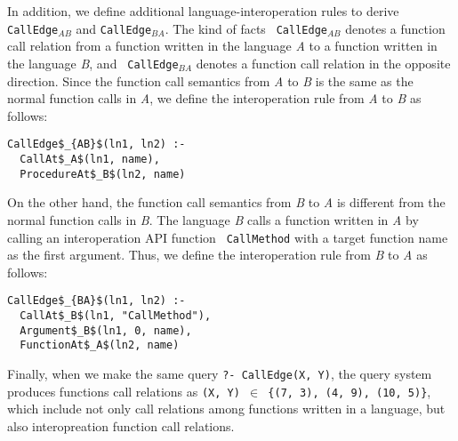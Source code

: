 \noindent
In addition, we define additional language-interoperation rules to derive {\tt
CallEdge$_{AB}$} and {\tt CallEdge$_{BA}$}. The kind of facts {\tt
CallEdge$_{AB}$} denotes a function call relation from a function written in
the language {\it A} to a function written in the language {\it B}, and {\tt
CallEdge$_{BA}$} denotes a function call relation in the opposite direction.
Since the function call semantics from {\it A} to {\it B} is the same as the
normal function calls in {\it A}, we define the interoperation rule from {\it
A} to {\it B} as follows: 


\begin{lstlisting}
CallEdge$_{AB}$(ln1, ln2) :-
  CallAt$_A$(ln1, name),
  ProcedureAt$_B$(ln2, name)
\end{lstlisting}

\noindent
On the other hand, the function call semantics from {\it B} to {\it A} is
different from the normal function calls in {\it B}. The language {\it B} calls
a function written in {\it A} by calling an interoperation API function {\tt
CallMethod} with a target function name as the first argument. Thus, we define
the interoperation rule from {\it B} to {\it A} as follows: 


\begin{lstlisting}
CallEdge$_{BA}$(ln1, ln2) :-
  CallAt$_B$(ln1, "CallMethod"),
  Argument$_B$(ln1, 0, name),
  FunctionAt$_A$(ln2, name)
\end{lstlisting}

%

Finally, when we make the same query {\tt ?- CallEdge(X, Y)}, the query system
produces functions call relations as {\tt (X, Y) $\in$ \{(7, 3), (4, 9), (10,
5)\}}, which include not only call relations among functions written in a
language, but also interopreation function call relations. 

